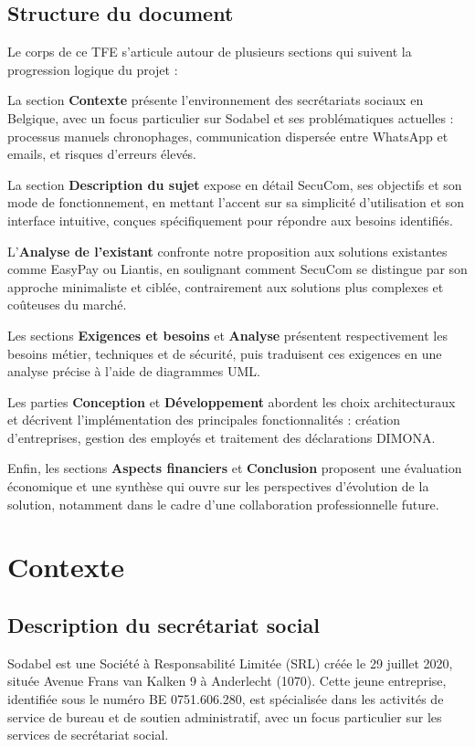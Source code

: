 \documentclass[12pt,a4paper]{report}
\begin{document}
\section{Structure du document}

Le corps de ce TFE s'articule autour de plusieurs sections qui suivent la progression logique du projet :

La section \textbf{Contexte} présente l'environnement des secrétariats sociaux en Belgique, avec un focus particulier sur Sodabel et ses problématiques actuelles : processus manuels chronophages, communication dispersée entre WhatsApp et emails, et risques d'erreurs élevés.

La section \textbf{Description du sujet} expose en détail SecuCom, ses objectifs et son mode de fonctionnement, en mettant l'accent sur sa simplicité d'utilisation et son interface intuitive, conçues spécifiquement pour répondre aux besoins identifiés.

L'\textbf{Analyse de l'existant} confronte notre proposition aux solutions existantes comme EasyPay ou Liantis, en soulignant comment SecuCom se distingue par son approche minimaliste et ciblée, contrairement aux solutions plus complexes et coûteuses du marché.

Les sections \textbf{Exigences et besoins} et \textbf{Analyse} présentent respectivement les besoins métier, techniques et de sécurité, puis traduisent ces exigences en une analyse précise à l'aide de diagrammes UML.

Les parties \textbf{Conception} et \textbf{Développement} abordent les choix architecturaux et décrivent l'implémentation des principales fonctionnalités : création d'entreprises, gestion des employés et traitement des déclarations DIMONA.

Enfin, les sections \textbf{Aspects financiers} et \textbf{Conclusion} proposent une évaluation économique et une synthèse qui ouvre sur les perspectives d'évolution de la solution, notamment dans le cadre d'une collaboration professionnelle future.

\chapter{Contexte}

\section{Description du secrétariat social}

Sodabel est une Société à Responsabilité Limitée (SRL) créée le 29 juillet 2020, située Avenue Frans van Kalken 9 à Anderlecht (1070). Cette jeune entreprise, identifiée sous le numéro BE 0751.606.280, est spécialisée dans les activités de service de bureau et de soutien administratif, avec un focus particulier sur les services de secrétariat social.
\end{document}
